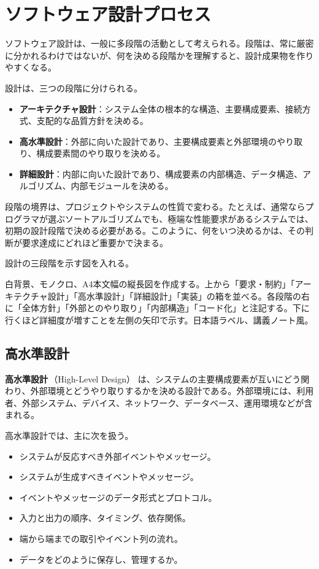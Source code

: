 \documentclass[10.5pt,a4paper]{ltjsarticle}
\newcommand{\term}[2]{\textbf{#1}\,（#2）}
\begin{document}
\section{ソフトウェア設計プロセス}

ソフトウェア設計は、一般に多段階の活動として考えられる。段階は、常に厳密に分かれるわけではないが、何を決める段階かを理解すると、設計成果物を作りやすくなる。

設計は、三つの段階に分けられる。
\begin{itemize}
  \item \textbf{アーキテクチャ設計}：システム全体の根本的な構造、主要構成要素、接続方式、支配的な品質方針を決める。
  \item \textbf{高水準設計}：外部に向いた設計であり、主要構成要素と外部環境のやり取り、構成要素間のやり取りを決める。
  \item \textbf{詳細設計}：内部に向いた設計であり、構成要素の内部構造、データ構造、アルゴリズム、内部モジュールを決める。
\end{itemize}

段階の境界は、プロジェクトやシステムの性質で変わる。たとえば、通常ならプログラマが選ぶソートアルゴリズムでも、極端な性能要求があるシステムでは、初期の設計段階で決める必要がある。このように、何をいつ決めるかは、その判断が要求達成にどれほど重要かで決まる。

\begin{todobox}
設計の三段階を示す図を入れる。
\end{todobox}
\begin{promptbox}
白背景、モノクロ、A4本文幅の縦長図を作成する。上から「要求・制約」「アーキテクチャ設計」「高水準設計」「詳細設計」「実装」の箱を並べる。各段階の右に「全体方針」「外部とのやり取り」「内部構造」「コード化」と注記する。下に行くほど詳細度が増すことを左側の矢印で示す。日本語ラベル、講義ノート風。
\end{promptbox}

\subsection{高水準設計}

\term{高水準設計}{High-Level Design} は、システムの主要構成要素が互いにどう関わり、外部環境とどうやり取りするかを決める設計である。外部環境には、利用者、外部システム、デバイス、ネットワーク、データベース、運用環境などが含まれる。

高水準設計では、主に次を扱う。
\begin{itemize}
  \item システムが反応すべき外部イベントやメッセージ。
  \item システムが生成すべきイベントやメッセージ。
  \item イベントやメッセージのデータ形式とプロトコル。
  \item 入力と出力の順序、タイミング、依存関係。
  \item 端から端までの取引やイベント列の流れ。
  \item データをどのように保存し、管理するか。
\end{itemize}
\end{document}
